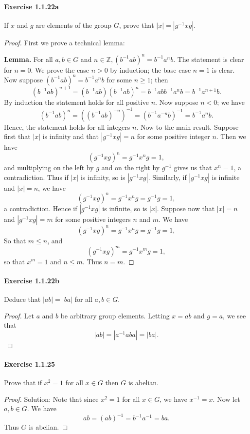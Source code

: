 \documentclass{article}
\theoremstyle{definition}
\begin{document}
\paragraph{Exercise 1.1.22a} If $x$ and $g$ are elements of the group $G$, prove that $|x|=\left|g^{-1} x g\right|$.
\begin{proof}
    First we prove a technical lemma:

    {\bf Lemma.} For all $a, b \in G$ and $n \in \mathbb{Z},\left(b^{-1} a b\right)^n=b^{-1} a^n b$.
The statement is clear for $n=0$. We prove the case $n>0$ by induction; the base case $n=1$ is clear. Now suppose $\left(b^{-1} a b\right)^n=b^{-1} a^n b$ for some $n \geq 1$; then
$$
\left(b^{-1} a b\right)^{n+1}=\left(b^{-1} a b\right)\left(b^{-1} a b\right)^n=b^{-1} a b b^{-1} a^n b=b^{-1} a^{n+1} b .
$$
By induction the statement holds for all positive $n$.
Now suppose $n<0$; we have
$$
\left(b^{-1} a b\right)^n=\left(\left(b^{-1} a b\right)^{-n}\right)^{-1}=\left(b^{-1} a^{-n} b\right)^{-1}=b^{-1} a^n b .
$$
Hence, the statement holds for all integers $n$.
Now to the main result. Suppose first that $|x|$ is infinity and that $\left|g^{-1} x g\right|=n$ for some positive integer $n$. Then we have
$$
\left(g^{-1} x g\right)^n=g^{-1} x^n g=1,
$$
and multiplying on the left by $g$ and on the right by $g^{-1}$ gives us that $x^n=1$, a contradiction. Thus if $|x|$ is infinity, so is $\left|g^{-1} x g\right|$. Similarly, if $\left|g^{-1} x g\right|$ is infinite and $|x|=n$, we have
$$
\left(g^{-1} x g\right)^n=g^{-1} x^n g=g^{-1} g=1,
$$
a contradiction. Hence if $\left|g^{-1} x g\right|$ is infinite, so is $|x|$.
Suppose now that $|x|=n$ and $\left|g^{-1} x g\right|=m$ for some positive integers $n$ and $m$. We have
$$
\left(g^{-1} x g\right)^n=g^{-1} x^n g=g^{-1} g=1,
$$
So that $m \leq n$, and
$$
\left(g^{-1} x g\right)^m=g^{-1} x^m g=1,
$$
so that $x^m=1$ and $n \leq m$. Thus $n=m$.
\end{proof}


\paragraph{Exercise 1.1.22b} Deduce that $|a b|=|b a|$ for all $a, b \in G$.
\begin{proof}
    Let $a$ and $b$ be arbitrary group elements. Letting $x=a b$ and $g=a$, we see that
$$
|a b|=\left|a^{-1} a b a\right|=|b a| .
$$
\end{proof}


\paragraph{Exercise 1.1.25} Prove that if $x^{2}=1$ for all $x \in G$ then $G$ is abelian.
\begin{proof}
    Solution: Note that since $x^2=1$ for all $x \in G$, we have $x^{-1}=x$. Now let $a, b \in G$. We have
$$
a b=(a b)^{-1}=b^{-1} a^{-1}=b a .
$$
Thus $G$ is abelian.
\end{proof}
\end{document}
